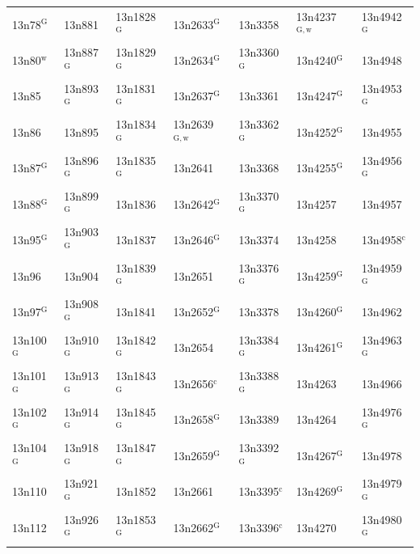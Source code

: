\documentclass[12pt, oneside]{amsart}
\begin{document}
{\begin{longtable}{*{7}{>{\raggedright\arraybackslash}p{}}}
13n78$^{\mathrm{G}}$ & 13n881 & 13n1828$^{\mathrm{G}}$ & 13n2633$^{\mathrm{G}}$ & 13n3358 & 13n4237$^{\mathrm{G,w}}$ & 13n4942$^{\mathrm{G}}$ \\
13n80$^{\mathrm{w}}$ & 13n887$^{\mathrm{G}}$ & 13n1829$^{\mathrm{G}}$ & 13n2634$^{\mathrm{G}}$ & 13n3360$^{\mathrm{G}}$ & 13n4240$^{\mathrm{G}}$ & 13n4948 \\
13n85 & 13n893$^{\mathrm{G}}$ & 13n1831$^{\mathrm{G}}$ & 13n2637$^{\mathrm{G}}$ & 13n3361 & 13n4247$^{\mathrm{G}}$ & 13n4953$^{\mathrm{G}}$ \\
13n86 & 13n895 & 13n1834$^{\mathrm{G}}$ & 13n2639$^{\mathrm{G,w}}$ & 13n3362$^{\mathrm{G}}$ & 13n4252$^{\mathrm{G}}$ & 13n4955 \\
13n87$^{\mathrm{G}}$ & 13n896$^{\mathrm{G}}$ & 13n1835$^{\mathrm{G}}$ & 13n2641 & 13n3368 & 13n4255$^{\mathrm{G}}$ & 13n4956$^{\mathrm{G}}$ \\
13n88$^{\mathrm{G}}$ & 13n899$^{\mathrm{G}}$ & 13n1836 & 13n2642$^{\mathrm{G}}$ & 13n3370$^{\mathrm{G}}$ & 13n4257 & 13n4957 \\
13n95$^{\mathrm{G}}$ & 13n903$^{\mathrm{G}}$ & 13n1837 & 13n2646$^{\mathrm{G}}$ & 13n3374 & 13n4258 & 13n4958$^{\mathrm{c}}$ \\
13n96 & 13n904 & 13n1839$^{\mathrm{G}}$ & 13n2651 & 13n3376$^{\mathrm{G}}$ & 13n4259$^{\mathrm{G}}$ & 13n4959$^{\mathrm{G}}$ \\
13n97$^{\mathrm{G}}$ & 13n908$^{\mathrm{G}}$ & 13n1841 & 13n2652$^{\mathrm{G}}$ & 13n3378 & 13n4260$^{\mathrm{G}}$ & 13n4962 \\
13n100$^{\mathrm{G}}$ & 13n910$^{\mathrm{G}}$ & 13n1842$^{\mathrm{G}}$ & 13n2654 & 13n3384$^{\mathrm{G}}$ & 13n4261$^{\mathrm{G}}$ & 13n4963$^{\mathrm{G}}$ \\
13n101$^{\mathrm{G}}$ & 13n913$^{\mathrm{G}}$ & 13n1843$^{\mathrm{G}}$ & 13n2656$^{\mathrm{c}}$ & 13n3388$^{\mathrm{G}}$ & 13n4263 & 13n4966 \\
13n102$^{\mathrm{G}}$ & 13n914$^{\mathrm{G}}$ & 13n1845$^{\mathrm{G}}$ & 13n2658$^{\mathrm{G}}$ & 13n3389 & 13n4264 & 13n4976$^{\mathrm{G}}$ \\
13n104$^{\mathrm{G}}$ & 13n918$^{\mathrm{G}}$ & 13n1847$^{\mathrm{G}}$ & 13n2659$^{\mathrm{G}}$ & 13n3392$^{\mathrm{G}}$ & 13n4267$^{\mathrm{G}}$ & 13n4978 \\
13n110 & 13n921$^{\mathrm{G}}$ & 13n1852 & 13n2661 & 13n3395$^{\mathrm{c}}$ & 13n4269$^{\mathrm{G}}$ & 13n4979$^{\mathrm{G}}$ \\
13n112 & 13n926$^{\mathrm{G}}$ & 13n1853$^{\mathrm{G}}$ & 13n2662$^{\mathrm{G}}$ & 13n3396$^{\mathrm{c}}$ & 13n4270 & 13n4980$^{\mathrm{G}}$ \\

\end{longtable}}
\end{document}
